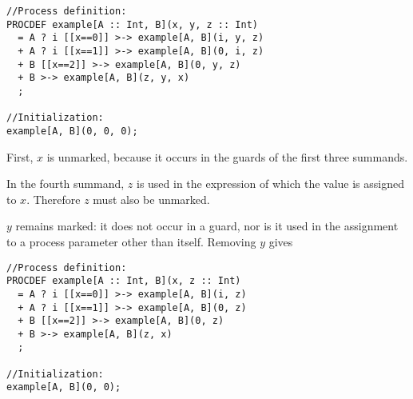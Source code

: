 \begin{lstlisting}
//Process definition:
PROCDEF example[A :: Int, B](x, y, z :: Int)
  = A ? i [[x==0]] >-> example[A, B](i, y, z)
  + A ? i [[x==1]] >-> example[A, B](0, i, z)
  + B [[x==2]] >-> example[A, B](0, y, z)
  + B >-> example[A, B](z, y, x)
  ;

//Initialization:
example[A, B](0, 0, 0);
\end{lstlisting}

First, $x$ is unmarked, because it occurs in the guards of the first three summands.

In the fourth summand, $z$ is used in the expression of which the value is assigned to $x$.
Therefore $z$ must also be unmarked.

$y$ remains marked: it does not occur in a guard, nor is it used in the assignment to a process parameter other than itself.
Removing $y$ gives

\begin{lstlisting}
//Process definition:
PROCDEF example[A :: Int, B](x, z :: Int)
  = A ? i [[x==0]] >-> example[A, B](i, z)
  + A ? i [[x==1]] >-> example[A, B](0, z)
  + B [[x==2]] >-> example[A, B](0, z)
  + B >-> example[A, B](z, x)
  ;

//Initialization:
example[A, B](0, 0);
\end{lstlisting}



